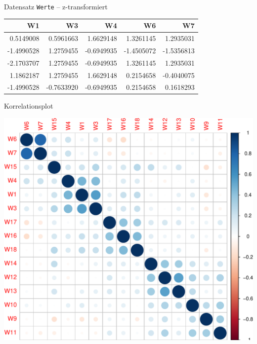 \begin{frame}{Datensatz \texttt{Werte} -- z-transformiert}

\begin{longtable}[]{@{}rrrrr@{}}
\toprule
W1 & W3 & W4 & W6 & W7\tabularnewline
\midrule
\endhead
0.5149008 & 0.5961663 & 1.6629148 & 1.3261145 & 1.2935031\tabularnewline
-1.4990528 & 1.2759455 & -0.6949935 & -1.4505072 &
-1.5356813\tabularnewline
-2.1703707 & 1.2759455 & -0.6949935 & 1.3261145 &
1.2935031\tabularnewline
1.1862187 & 1.2759455 & 1.6629148 & 0.2154658 &
-0.4040075\tabularnewline
-1.4990528 & -0.7633920 & -0.6949935 & 0.2154658 &
0.1618293\tabularnewline
\bottomrule
\end{longtable}

\end{frame}

\begin{frame}[fragile]{Korrelationsplot}

\begin{Shaded}
\begin{Highlighting}[]
\OperatorTok{::}\NormalTok{(} \NormalTok{)}
\end{Highlighting}
\end{Shaded}

\begin{center}\includegraphics[width=0.5\linewidth]{PraDa_Folien_nm_2_files/figure-beamer/unnamed-chunk-27-1} \end{center}

\end{frame}

